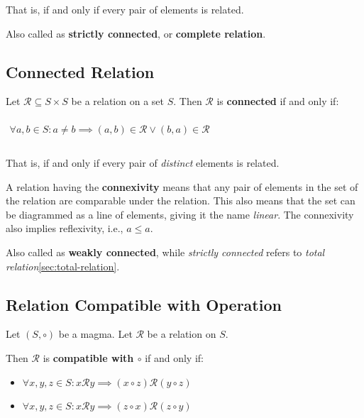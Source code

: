 That is, if and only if every pair of elements is related.

Also called as \textbf{strictly connected}, or \textbf{complete
  relation}.

\subsection{Connected Relation}
\label{sec:connected-relation}

Let $\mathcal{R} \subseteq S \times S$ be a relation on a set
$S$. Then $\mathcal{R}$ is \textbf{connected} if and only if:

\begin{math}
  \begin{array}{c}
    \\
    \forall a, b \in S: a \neq b \implies (a, b) \in \mathcal{R} \lor (b,a) \in \mathcal{R} \\
    \\
  \end{array}
\end{math}


That is, if and only if every pair of \textit{distinct} elements is
related.


A relation having the \textbf{connexivity} means that any pair of
elements in the set of the relation are comparable under the
relation. This also means that the set can be diagrammed as a line of
elements, giving it the name \textit{linear}. The connexivity also
implies reflexivity, i.e., $a \leq a$.

Also called as \textbf{weakly connected}, while \textit{strictly
  connected} refers to \textit{total
  relation}\ref{sec:total-relation}.


\subsection{Relation Compatible with Operation}
\label{sec:compatibility}

Let $(S, \circ)$ be a magma. Let $\mathcal{R}$ be a relation on $S$.

Then $\mathcal{R}$ is \textbf{compatible with $\circ$} if and only if:

\begin{itemize}
\item $\forall x, y, z \in S: x \mathcal{R} y \implies (x \circ z) \mathcal{R} (y \circ z)$
\item $\forall x, y, z \in S: x \mathcal{R} y \implies (z \circ x) \mathcal{R} (z \circ y)$
\end{itemize}


